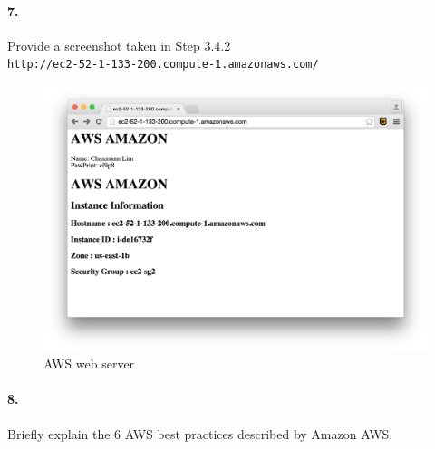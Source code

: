\documentclass[a4paper]{article}
\begin{document}
\paragraph{7. } Provide a screenshot taken in Step 3.4.2 \\

\texttt{http://ec2-52-1-133-200.compute-1.amazonaws.com/} \\
\begin{figure}[H]
  \centering
    \includegraphics[scale=.4]{aws_web_server.png}
  \caption{AWS web server}
\end{figure} 

\paragraph{8. } Briefly explain the 6 AWS best practices described by Amazon AWS. 
\end{document}
